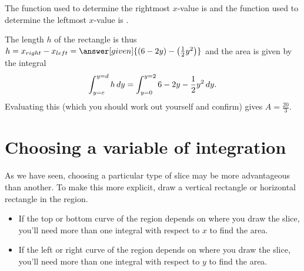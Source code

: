 \documentclass{ximera}
\begin{document}
\begin{example}
\begin{explanation}
\begin{image}
            \end{image}
            
            
The function used to determine the rightmost $x$-value is  and the function used to determine the leftmost $x$-value is .

The length $h$ of the rectangle is thus $h=x_{right}-x_{left} = \answer[given]{(6-2y)-\left(\frac{1}{2}y^2\right)}$ and the area is given by the integral
  \[
 \int_{y=c}^{y=d} h \mathop{}\!d y =  \int_{y=0}^{y=2} 6-2y-\frac{1}{2}y^2 \mathop{}\!d y .
  \]
  Evaluating this (which you should work out yourself and confirm) gives $A= \frac{20}{3}.$
 \end{explanation}
 
\end{example}

\section{Choosing a variable of integration}
As we have seen, choosing a particular type of slice may be more advantageous than another.  To make this more explicit, draw a vertical rectangle or horizontal rectangle in the region. 

\begin{itemize}
\item If the top or bottom curve of the region depends on where you draw the slice, you'll need more than one integral with respect to $x$ to find the area.
\item If the left or right curve of the region depends on where you draw the slice, you'll need more than one integral with respect to $y$ to find the area.
\end{itemize}
\end{document}
